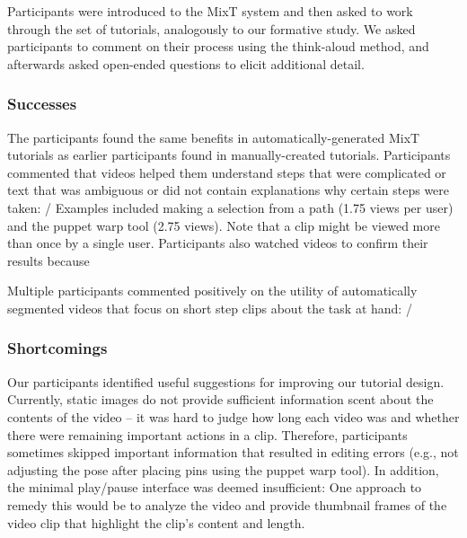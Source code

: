 Participants were introduced to the MixT system and then asked to work through the set of tutorials, analogously to our formative study. We asked participants to comment on their process using the think-aloud method, and afterwards asked open-ended questions to elicit additional detail.

\subsubsection{Successes}
The participants found the same benefits in automatically-generated MixT tutorials as earlier participants found in manually-created tutorials. Participants commented that videos helped them understand steps that were complicated or text that was ambiguous or did not contain explanations why certain steps were taken:  /  Examples included making a selection from a path (1.75 views per user) and the puppet warp tool (2.75 views). Note that a clip might be viewed more than once by a single user. Participants also watched videos to confirm their results because 

Multiple participants commented positively on the utility of automatically segmented videos that focus on short step clips about the task at hand:  / 

\subsubsection{Shortcomings}
Our participants identified useful suggestions for improving our tutorial design. Currently, static images do not provide sufficient information scent about the contents of the video – it was hard to judge how long each video was and whether there were remaining important actions in a clip. Therefore, participants sometimes skipped important information that resulted in editing errors (e.g., not adjusting the pose after placing pins using the puppet warp tool). In addition, the minimal play/pause interface was deemed insufficient:  One approach to remedy this would be to analyze the video and provide thumbnail frames of the video clip that highlight the clip's content and length.

